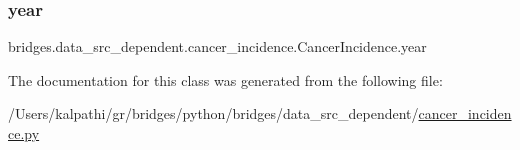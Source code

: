 \subsubsection{\texorpdfstring{year}{year}}
{\footnotesize\ttfamily bridges.\+data\+\_\+src\+\_\+dependent.\+cancer\+\_\+incidence.\+Cancer\+Incidence.\+year}



The documentation for this class was generated from the following file\+:\begin{DoxyCompactItemize}
\item 
/\+Users/kalpathi/gr/bridges/python/bridges/data\+\_\+src\+\_\+dependent/\mbox{\hyperlink{cancer__incidence_8py}{cancer\+\_\+incidence.\+py}}\end{DoxyCompactItemize}
